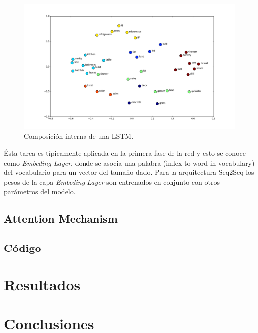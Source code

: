 \documentclass[12pt, letterpaper]{article}
\begin{document}
    \begin{figure}[H]
        \centering
        \includegraphics[width=\linewidth]{img/we1.png}
        \caption{Composición interna de una LSTM.}
    \end{figure}

    Ésta tarea es típicamente aplicada en la primera fase de la red y esto se conoce como \emph{Embeding Layer}, donde se asocia una palabra (index to word in vocabulary) del vocabulario para un vector del tamaño dado. Para la arquitectura Seq2Seq los pesos de la capa \emph{Embeding Layer} son entrenados en conjunto con otros parámetros del modelo\cite{Ramamoorthy}.

    \subsection{Attention Mechanism}
    \subsection{Código}

    \section{Resultados}
    \section{Conclusiones}

    \pagebreak
    \printbibliography[title={Bibliografía}]
\end{document}
